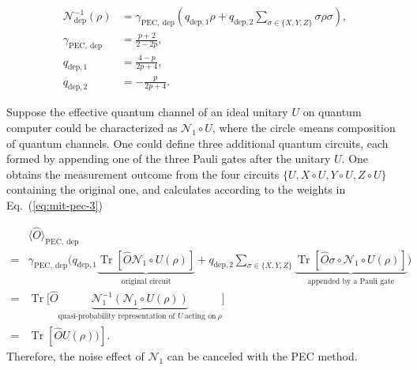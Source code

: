 \begin{equation}
    \label{eq:mit-pec-3}
    \begin{split}
        \mathcal{N}^{-1}_{\mathrm{dep}}( \rho ) & =\gamma _{\mathrm{PEC} ,\ \mathrm{dep}}\left( q_{\mathrm{dep} ,1} \rho +q_{\mathrm{dep} ,2}\sum _{\sigma \in \{X,Y,Z\}} \sigma \rho \sigma \right) ,\\
        \gamma _{\mathrm{PEC} ,\ \mathrm{dep}} & =\frac{p+2}{2-2p} ,\\
        q_{\mathrm{dep} ,1} & =\frac{4-p}{2p+4} ,\\
        q_{\mathrm{dep} ,2} & =-\frac{p}{2p+4} .
    \end{split}
\end{equation}

Suppose the effective quantum channel of an ideal unitary $U$ on quantum computer could be characterized as $\mathcal{N}_{1} \circ U$, where the circle $\circ $means composition of quantum channels. One could define three additional quantum circuits, each formed by appending one of the three Pauli gates after the unitary $U$.
One obtains the measurement outcome from the four circuits $\{U,X\circ U,Y\circ U,Z\circ U\}$ containing the original one, and calculates according to the weights in Eq.~(\ref{eq:mit-pec-3})

\begin{equation}
    \begin{split}
        \label{eq:mit-pec-4}
        & \langle \hat{O} \rangle_{\mathrm{PEC} ,\ \mathrm{dep}}                                                                                                                                                \\
        = & \gamma _{\mathrm{PEC} ,\ \mathrm{dep}}\bigg(q_{\mathrm{dep} ,1}\underbrace{\operatorname{Tr}[\hat{O} \mathcal{N}_{1} \circ U( \rho )]}_{\text{original circuit}} + q_{\mathrm{dep} ,2}\sum _{\sigma \in \{X,Y,Z\}}\underbrace{\operatorname{Tr}[ \hat{O} \sigma \circ \mathcal{N}_{1} \circ U( \rho )]}_{\text{appended by a Pauli gate}}\bigg)               \\
        = & \operatorname{Tr}\Big[\hat{O}\underbrace{\mathcal{N}^{-1}_{1}(\mathcal{N}_{1} \circ U( \rho ))}_{\text{quasi-probability\ representation\ of\ } U\ \text{acting\ on} \ \rho }\Big] \\
        = & \operatorname{Tr}[ \hat{O} U( \rho ))].
    \end{split}
\end{equation}
Therefore, the noise effect of $\mathcal{N}_{1}$ can be canceled with the PEC method.

